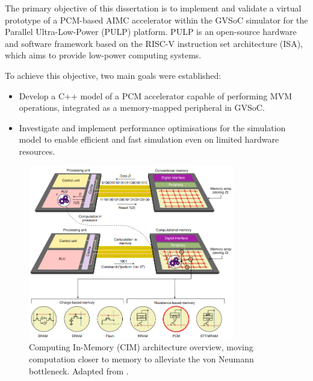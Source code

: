 The primary objective of this dissertation is to implement and validate a virtual prototype of a PCM-based AIMC accelerator within the GVSoC \cite{bruschi_gvsoc_2021} simulator for the Parallel Ultra-Low-Power (PULP) platform.
PULP is an open-source hardware and software framework based on the RISC-V instruction set architecture (ISA), which aims to provide low-power computing systems.

To achieve this objective, two main goals were established:
\begin{itemize}
\item Develop a C++ model of a PCM accelerator capable of performing MVM operations, integrated as a memory-mapped peripheral in GVSoC.\\
\item Investigate and implement performance optimisations for the simulation model to enable efficient and fast simulation even on limited hardware resources.
\end{itemize}

\begin{figure}[H]
  \centering
  \includegraphics[width=0.8\textwidth]{Figures/CIM.png}
  \caption{Computing In-Memory (CIM) architecture overview, moving computation closer to memory to alleviate the von Neumann bottleneck. Adapted from \cite{sebastian_memory_2020}.}
  \label{fig:cim}
\end{figure}

